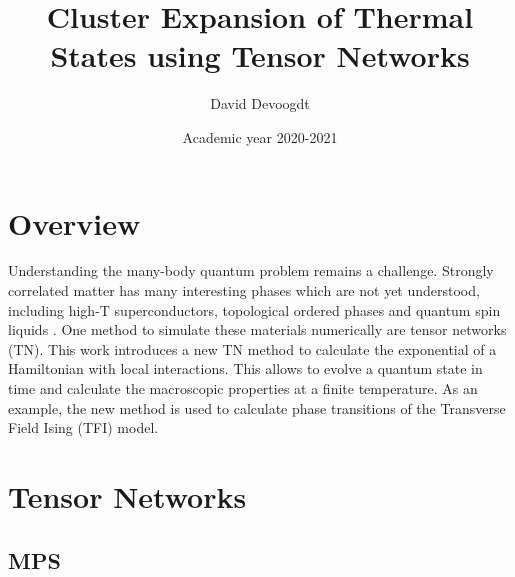 \documentclass[twocolumn]{article}
\title{Cluster Expansion of Thermal States using Tensor
Networks}
\author{David Devoogdt}
\date{Academic year 2020-2021}
\newcounter{a}
\newcounter{b}
\begin{document}



\maketitle

\begin{abstract}
    
\end{abstract}

\section{Overview}

Understanding the many-body quantum problem remains a challenge. Strongly correlated matter has many interesting phases which are not yet understood, including high-T superconductors, topological ordered phases and quantum spin liquids \cite{Orus2014}. One method to simulate these materials numerically are tensor networks (TN). This work introduces a new TN method to calculate the exponential of a Hamiltonian with local interactions. This allows to evolve a quantum state in time and calculate the macroscopic properties at a finite temperature. As an example, the new method is used to calculate phase transitions of the Transverse Field Ising (TFI) model.

\section{Tensor Networks}
\subsection{MPS}
\end{document}
